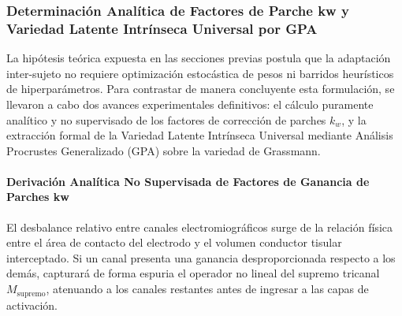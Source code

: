 \documentclass[11pt,a4paper,openany]{book}
\theoremstyle{definition}
\begin{document}
\subsubsection{Determinación Analítica de Factores de Parche kw y Variedad Latente Intrínseca Universal por GPA}
\label{subsubsec:kw_analitico_y_variedad_gpa}

La hipótesis teórica expuesta en las secciones previas postula que la adaptación inter-sujeto no requiere optimización estocástica de pesos ni barridos heurísticos de hiperparámetros. Para contrastar de manera concluyente esta formulación, se llevaron a cabo dos avances experimentales definitivos: el cálculo puramente analítico y no supervisado de los factores de corrección de parches $k_w$, y la extracción formal de la Variedad Latente Intrínseca Universal mediante Análisis Procrustes Generalizado (GPA) sobre la variedad de Grassmann.

\paragraph{Derivación Analítica No Supervisada de Factores de Ganancia de Parches kw}
El desbalance relativo entre canales electromiográficos surge de la relación física entre el área de contacto del electrodo y el volumen conductor tisular interceptado. Si un canal presenta una ganancia desproporcionada respecto a los demás, capturará de forma espuria el operador no lineal del supremo tricanal $M_{\text{supremo}}$, atenuando a los canales restantes antes de ingresar a las capas de activación.
\end{document}
